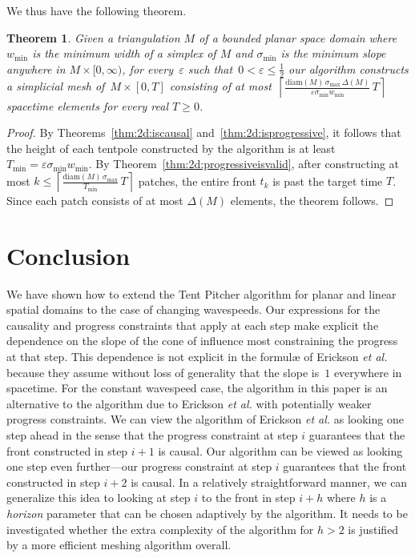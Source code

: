 \documentclass[twocolumn]{article}
\def\minW{\ensuremath{w_{\text{min}}}}
\def\S{\ensuremath{\sigma}}
\def\minS{\ensuremath{\S_{\text{min}}}}
\def\maxS{\ensuremath{\S_{\text{max}}}}
\def\minT{\ensuremath{T_{\text{min}}}}
\def\e{\ensuremath{\varepsilon}}
\def\sp{\ensuremath{M}}
\def\diam{\text{diam}}
\def\half{\ensuremath{\frac{1}{2}}}
\def\ceil#1{\ensuremath{\left\lceil{#1}\right\rceil}}
\def\etal{\textsl{et al.}}
\newtheorem{theorem}[lemma]{Theorem}
\begin{document}
We thus have the following theorem.

\begin{theorem}
  Given a triangulation $\sp$ of a bounded planar space domain
  where $\minW$ is the minimum width of a simplex of $\sp$ and $\minS$
  is the minimum slope anywhere in $\sp \times [0,\infty)$, for
  every~$\e$ such that~$0 < \e \le \half$ our algorithm constructs a
  simplicial mesh of~$\sp \times [0,T]$ consisting of at
  most~$\ceil{\frac{\diam(\sp) \, \maxS \, \Delta(\sp)}{\e \minS
      \minW} \, T}$ spacetime elements for every real $T \ge 0$.
\label{thm:2d:main}
\end{theorem}
\begin{proof}
  By Theorems~\ref{thm:2d:iscausal} and~\ref{thm:2d:isprogressive}, it
  follows that the height of each tentpole constructed by the
  algorithm is at least $\minT = \e \minS \minW$.  By
  Theorem~\ref{thm:2d:progressiveisvalid}, after constructing at most
  $k \le \ceil{\frac{\diam(\sp) \, \maxS}{\minT} \, T}$ patches, the
  entire front $t_k$ is past the target time $T$.  Since each patch
  consists of at most $\Delta(\sp)$ elements, the theorem follows.
\end{proof}







\section{Conclusion}
\label{sec:conclusion}

We have shown how to extend the Tent Pitcher algorithm for planar and
linear spatial domains to the case of changing wavespeeds.  Our
expressions for the causality and progress constraints that apply at
each step make explicit the dependence on the slope of the cone of
influence most constraining the progress at that step.  This
dependence is not explicit in the formul\ae{} of Erickson \etal{}
because they assume without loss of generality that the slope is~$1$
everywhere in spacetime.  For the constant wavespeed case, the
algorithm in this paper is an alternative to the algorithm due to
Erickson \etal{} with potentially weaker progress constraints.  We can
view the algorithm of Erickson \etal{} as looking one step ahead in
the sense that the progress constraint at step $i$ guarantees that the
front constructed in step $i+1$ is causal.  Our algorithm can be
viewed as looking one step even further---our progress constraint at
step $i$ guarantees that the front constructed in step $i+2$ is
causal.  In a relatively straightforward manner, we can generalize
this idea to looking at step $i$ to the front in step $i+h$ where $h$
is a \emph{horizon} parameter that can be chosen adaptively by the
algorithm.  It needs to be investigated whether the extra complexity
of the algorithm for $h > 2$ is justified by a more efficient meshing
algorithm overall.
\end{document}
